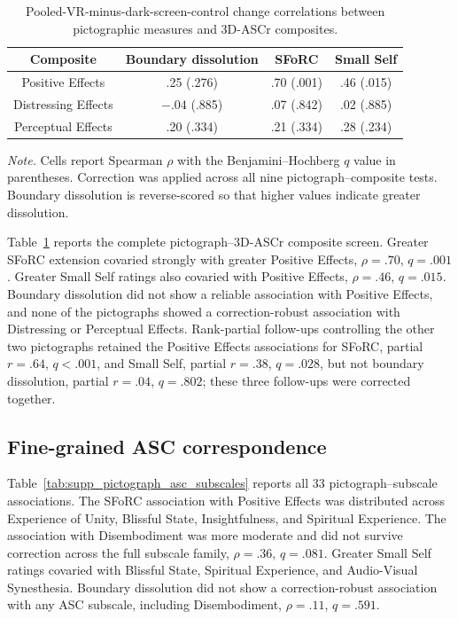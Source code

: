 \documentclass[pdflatex,sn-basic,lineno]{../sn-jnl}
\begin{document}
\begin{table}[!htbp]
\centering
\small
\setlength{\tabcolsep}{4pt}
\caption{Pooled-VR-minus-dark-screen-control change correlations between pictographic measures and 3D-ASCr composites.}
\label{tab:supp_pictograph_asc_composites}
\begin{tabular*}{\textwidth}{@{\extracolsep{\fill}}cccc@{}}
\toprule
Composite & Boundary dissolution & SFoRC & Small Self \\
\midrule
Positive Effects & .25 (.276) & .70 (.001) & .46 (.015) \\
Distressing Effects & $-.04$ (.885) & .07 (.842) & .02 (.885) \\
Perceptual Effects & .20 (.334) & .21 (.334) & .28 (.234) \\
\bottomrule
\end{tabular*}
\par\smallskip
\parbox{\textwidth}{\footnotesize\textit{Note.} Cells report Spearman $\rho$ with the Benjamini--Hochberg $q$ value in parentheses. Correction was applied across all nine pictograph--composite tests. Boundary dissolution is reverse-scored so that higher values indicate greater dissolution.}
\end{table}
\FloatBarrier

Table~\ref{tab:supp_pictograph_asc_composites} reports the complete pictograph--3D-ASCr composite screen. Greater SFoRC extension covaried strongly with greater Positive Effects, $\rho=.70$, $q=.001$. Greater Small Self ratings also covaried with Positive Effects, $\rho=.46$, $q=.015$. Boundary dissolution did not show a reliable association with Positive Effects, and none of the pictographs showed a correction-robust association with Distressing or Perceptual Effects. Rank-partial follow-ups controlling the other two pictographs retained the Positive Effects associations for SFoRC, partial $r=.64$, $q<.001$, and Small Self, partial $r=.38$, $q=.028$, but not boundary dissolution, partial $r=.04$, $q=.802$; these three follow-ups were corrected together.

\subsection{Fine-grained ASC correspondence}

Table~\ref{tab:supp_pictograph_asc_subscales} reports all 33 pictograph--subscale associations. The SFoRC association with Positive Effects was distributed across Experience of Unity, Blissful State, Insightfulness, and Spiritual Experience. The association with Disembodiment was more moderate and did not survive correction across the full subscale family, $\rho=.36$, $q=.081$. Greater Small Self ratings covaried with Blissful State, Spiritual Experience, and Audio-Visual Synesthesia. Boundary dissolution did not show a correction-robust association with any ASC subscale, including Disembodiment, $\rho=.11$, $q=.591$.
\end{document}
